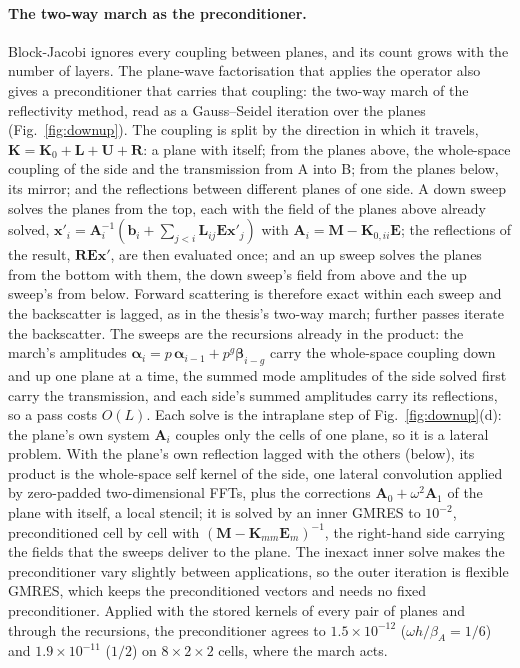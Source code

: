 \documentclass[11pt,a4paper]{article}
\newcommand{\bK}{\mathbf{K}}
\begin{document}
\paragraph{The two-way march as the preconditioner.} Block-Jacobi ignores every coupling between planes, and its
count grows with the number of layers. The plane-wave factorisation that applies the operator also gives a
preconditioner that carries that coupling: the two-way march of the reflectivity method, read as a Gauss--Seidel
iteration over the planes (Fig.~\ref{fig:downup}). The coupling is split by the direction in which it travels,
$\bK=\bK_0+\mathbf L+\mathbf U+\mathbf R$: a plane with itself; from the planes above, the whole-space coupling
of the side and the transmission from A into B; from the planes below, its mirror; and the reflections between
different planes of one side. A down sweep solves the planes from the top, each with the field of the planes
above already solved, $\mathbf x'_i=\mathbf A_i^{-1}(\mathbf b_i+\sum_{j<i}\mathbf L_{ij}\mathbf E\mathbf x'_j)$
with $\mathbf A_i=\mathbf M-\bK_{0,ii}\mathbf E$; the reflections of the result, $\mathbf R\mathbf E\mathbf x'$,
are then evaluated once; and an up sweep solves the planes from the bottom with them, the down sweep's field from
above and the up sweep's from below. Forward scattering is therefore exact within each sweep and the backscatter
is lagged, as in the thesis's two-way march; further passes iterate the backscatter. The sweeps are the
recursions already in the product: the march's amplitudes $\boldsymbol\alpha_i=p\,\boldsymbol\alpha_{i-1}+
p^g\boldsymbol\beta_{i-g}$ carry the whole-space coupling down and up one plane at a time, the summed mode
amplitudes of the side solved first carry the transmission, and each side's summed amplitudes carry its
reflections, so a pass costs $O(L)$. Each solve is the intraplane step of Fig.~\ref{fig:downup}(d): the plane's
own system $\mathbf A_i$ couples only the cells of one plane, so it is a lateral problem. With the plane's own
reflection lagged with the others (below), its product is the whole-space self kernel of the side, one lateral convolution applied by zero-padded two-dimensional FFTs, plus
the corrections $\mathbf A_0+\omega^2\mathbf A_1$ of the plane with itself, a local stencil; it is solved by an
inner GMRES to $10^{-2}$, preconditioned cell by cell with $(\mathbf M-\bK_{mm}\mathbf E_m)^{-1}$, the right-hand
side carrying the fields that the sweeps deliver to the plane. The inexact inner solve makes the preconditioner
vary slightly between applications, so the outer iteration is flexible GMRES, which keeps the preconditioned
vectors and needs no fixed preconditioner. Applied with the stored kernels of every pair of planes and through the recursions, the
preconditioner agrees to $1.5\times10^{-12}$ ($\omega h/\beta_A=1/6$) and $1.9\times10^{-11}$ ($1/2$) on
$8\times2\times2$ cells, where the march acts.
\end{document}
